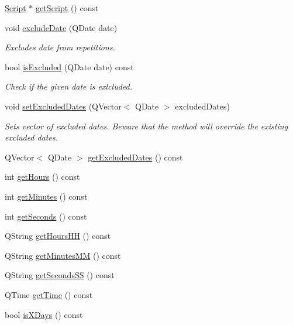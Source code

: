 \begin{DoxyCompactItemize}
\hyperlink{class_script}{Script} $\ast$ \hyperlink{class_action_aa64040ce289f147ee7240f461f9a14cc}{get\-Script} () const 
\item 
void \hyperlink{class_action_ae6de50f8591deacace5528723cfb3511}{exclude\-Date} (Q\-Date date)
\begin{DoxyCompactList}\small\item\em Excludes date from repetitions. \end{DoxyCompactList}\item 
bool \hyperlink{class_action_a9926c6292dadcbd1ceb35a0d01357dc1}{is\-Excluded} (Q\-Date date) const 
\begin{DoxyCompactList}\small\item\em Check if the given date is exlcluded. \end{DoxyCompactList}\item 
void \hyperlink{class_action_a55b4a13b734764bf0a9d15af3c92da70}{set\-Excluded\-Dates} (Q\-Vector$<$ Q\-Date $>$ excluded\-Dates)
\begin{DoxyCompactList}\small\item\em Sets vector of excluded dates. Beware that the method will override the existing excluded dates. \end{DoxyCompactList}\item 
Q\-Vector$<$ Q\-Date $>$ \hyperlink{class_action_aa74c530c5011d58aa43041e5d609fa46}{get\-Excluded\-Dates} () const 
\item 
int \hyperlink{class_action_aeccc29bed70c7913583ef291be1c9194}{get\-Hours} () const 
\item 
int \hyperlink{class_action_a28e52e595d62dcac10295a26abdfe912}{get\-Minutes} () const 
\item 
int \hyperlink{class_action_af912bd24d17ef4b7c5b45ba9d3bf3757}{get\-Seconds} () const 
\item 
Q\-String \hyperlink{class_action_a04d95a411c835229de0508477ea85457}{get\-Hours\-H\-H} () const 
\item 
Q\-String \hyperlink{class_action_a74526a1d22655318419e9ba8398438d6}{get\-Minutes\-M\-M} () const 
\item 
Q\-String \hyperlink{class_action_a158ec4d22a59899c46c79e1c5cdcd214}{get\-Seconds\-S\-S} () const 
\item 
Q\-Time \hyperlink{class_action_a01e6fdaabad6d3794f34a6c74b484095}{get\-Time} () const 
\item 
bool \hyperlink{class_action_a4e95f70f5532330f672ec6d4967cae30}{is\-X\-Days} () const 
\item 

\end{DoxyCompactItemize}
